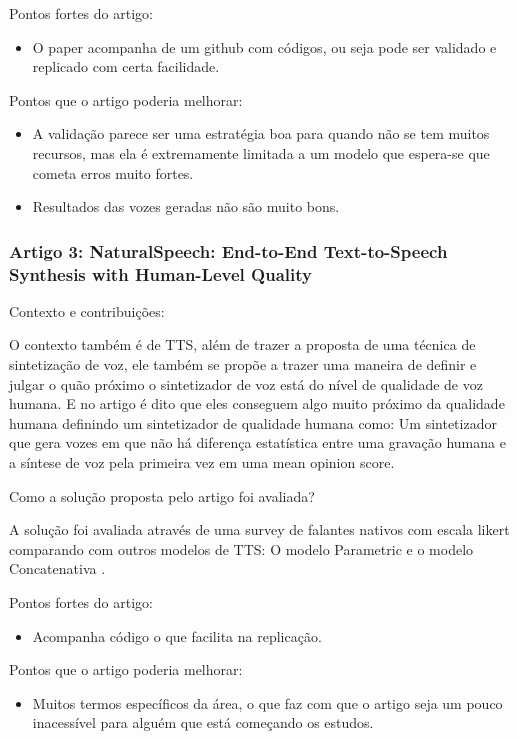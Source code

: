 \documentclass[a4paper,12pt]{article}
\begin{document}
			Pontos fortes do artigo:
			\begin{itemize}
				\item O paper acompanha de um github com códigos, ou seja pode ser validado e replicado com certa facilidade.
			\end{itemize}
			Pontos que o artigo poderia melhorar:
			\begin{itemize}
				\item A validação parece ser uma estratégia boa para quando não se tem muitos recursos, mas ela é extremamente limitada a um modelo que espera-se que cometa erros muito fortes.
				\item Resultados das vozes geradas não são muito bons.
			\end{itemize}
			
			\subsubsection{Artigo 3: NaturalSpeech: End-to-End Text-to-Speech Synthesis with Human-Level Quality}
			
			Contexto e contribuições:
						
			O contexto também é de TTS, além de trazer a proposta de uma técnica de sintetização de voz, ele também se propõe a trazer uma maneira de definir e julgar o quão próximo o sintetizador de voz está do nível de qualidade de voz humana. E no artigo é dito que eles conseguem algo muito próximo da qualidade humana definindo um sintetizador de qualidade humana como: Um sintetizador que gera vozes em que não há diferença estatística entre uma gravação humana e a síntese de voz pela primeira vez em uma mean opinion score.
			
			Como a solução proposta pelo artigo foi avaliada?
			
			A solução foi avaliada através de uma survey de falantes nativos com escala likert comparando com outros modelos de TTS: O modelo Parametric \cite{zen2016parametric} e o modelo Concatenativa \cite{goncalvo2016concatenative}.
			
			Pontos fortes do artigo:
			\begin{itemize}
				\item Acompanha código o que facilita na replicação.
			\end{itemize}
			Pontos que o artigo poderia melhorar:
			\begin{itemize}
				\item Muitos termos específicos da área, o que faz com que o artigo seja um pouco inacessível para alguém que está começando os estudos.
			\end{itemize}
			
\end{document}
